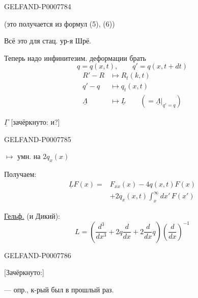 \begin{GelfandAdjacentEvidence}{GELFAND-P000778}{4}

(это получается из формул (5), (6))

Всё это для стац. ур-я Шрё.

Теперь надо инфинитезим. деформации брать
\[
q=q(x,t),\qquad q'=q(x,t+dt)
\]
\begin{align*}
R'-R&\longmapsto R_t(k,t)\\
q'-q&\longmapsto q_t(x,t)\\
\underline\Lambda&\longmapsto\underline L\qquad(=\underline\Lambda|_{q'=q})
\end{align*}

\(\underline\Gamma\) [зачёркнуто: и?]
\end{GelfandAdjacentEvidence}
\begin{GelfandAdjacentEvidence}{GELFAND-P000778}{5}

\(\longmapsto\) умн. на \(2q_x(x)\)

Получаем:
\begin{equation}
\begin{split}
\underline L F(x)={}&F_{xx}(x)-4q(x,t)F(x)\\
&+2q_x(x,t)\int_x^\infty dx'\,F(x')
\end{split}\tag{12}
\end{equation}

\underline{Гельф.} (и Дикий):
\[
L=\left(\frac{d^3}{dx^3}+2q\frac{d}{dx}+2\frac{d}{dx}q\right)
\left(\frac{d}{dx}\right)^{-1}
\]
\end{GelfandAdjacentEvidence}
\begin{GelfandAdjacentEvidence}{GELFAND-P000778}{6}


[Зачёркнуто:]
\end{GelfandAdjacentEvidence}


--- опр., к-рый был в прошлый раз.


